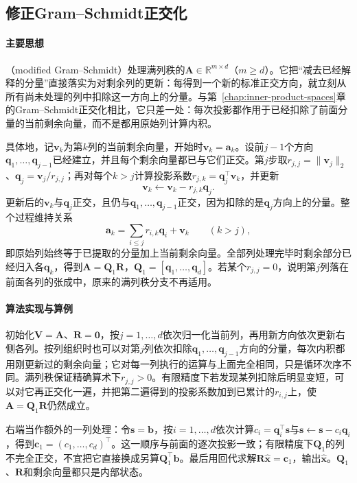 \subsection{修正Gram--Schmidt正交化}
\label{sec:ls-mgs}

\paragraph{主要思想}
（modified Gram--Schmidt）处理满列秩的$\bm A\in\mathbb R^{m\times d}$（$m\geq d$）。它把“减去已经解释的分量”直接落实为对剩余列的更新：每得到一个新的标准正交方向，就立刻从所有尚未处理的列中扣除这一方向上的分量。与第~\ref{chap:inner-product-spaces}章的Gram--Schmidt正交化相比，它只差一处：每次投影都作用于已经扣除了前面分量的当前剩余向量，而不是都用原始列计算内积。

具体地，记$\bm v_k$为第$k$列的当前剩余向量，开始时$\bm v_k=\bm a_k$。设前$j-1$个方向$\bm q_1,\ldots,\bm q_{j-1}$已经建立，并且每个剩余向量都已与它们正交。第$j$步取$r_{j,j}=\lVert\bm v_j\rVert_2$、$\bm q_j=\bm v_j/r_{j,j}$；再对每个$k>j$计算投影系数$r_{j,k}=\bm q_j^\top\bm v_k$，并更新
\[
 \bm v_k\leftarrow\bm v_k-r_{j,k}\bm q_j .
\]
更新后的$\bm v_k$与$\bm q_j$正交，且仍与$\bm q_1,\ldots,\bm q_{j-1}$正交，因为扣除的是$\bm q_j$方向上的分量。整个过程维持关系
\[
 \bm a_k=\sum_{i\leq j}r_{i,k}\bm q_i+\bm v_k\qquad(k>j),
\]
即原始列始终等于已提取的分量加上当前剩余向量。全部列处理完毕时剩余部分已经归入各$\bm q_k$，得到$\bm A=\bm Q_1\bm R$，$\bm Q_1=[\bm q_1,\ldots,\bm q_d]$。若某个$r_{j,j}=0$，说明第$j$列落在前面各列的张成中，原来的满列秩分支不再适用。

\paragraph{算法实现与算例}
初始化$\bm V=\bm A$、$\bm R=\bm0$，按$j=1,\ldots,d$依次归一化当前列，再用新方向依次更新右侧各列。按列组织时也可以对第$j$列依次扣除$\bm q_1,\ldots,\bm q_{j-1}$方向的分量，每次内积都用刚更新过的剩余向量；它对每一列执行的运算与上面完全相同，只是循环次序不同。满列秩保证精确算术下$r_{j,j}>0$。有限精度下若发现某列扣除后明显变短，可以对它再正交化一遍，并把第二遍得到的投影系数加到已累计的$r_{i,j}$上，使$\bm A=\bm Q_1\bm R$仍然成立。

右端当作额外的一列处理：令$\bm s=\bm b$，按$i=1,\ldots,d$依次计算$c_i=\bm q_i^\top\bm s$与$\bm s\leftarrow\bm s-c_i\bm q_i$，得到$\bm c_1=(c_1,\ldots,c_d)^\top$。这一顺序与前面的逐次投影一致；有限精度下$\bm Q_1$的列不完全正交，不宜把它直接换成另算$\bm Q_1^\top\bm b$。最后用回代求解$\bm R\hat{\bm x}=\bm c_1$，输出$\hat{\bm x}$。$\bm Q_1$、$\bm R$和剩余向量都只是内部状态。

